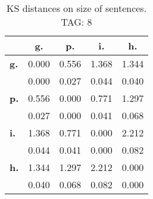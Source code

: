 \begin{table}[h!]
\begin{center}
\begin{tabular}{| l || c | c | c | c |}\hline
 & {\bf g.} & {\bf p.} & {\bf i.} & {\bf h.} \\\hline\hline
{\bf g.} & 0.000 & 0.556 & 1.368 & 1.344 \\
{\bf } & 0.000 & 0.027 & 0.044 & 0.040 \\\hline
{\bf p.} & 0.556 & 0.000 & 0.771 & 1.297 \\
{\bf } & 0.027 & 0.000 & 0.041 & 0.068 \\\hline
{\bf i.} & 1.368 & 0.771 & 0.000 & 2.212 \\
{\bf } & 0.044 & 0.041 & 0.000 & 0.082 \\\hline
{\bf h.} & 1.344 & 1.297 & 2.212 & 0.000 \\
{\bf } & 0.040 & 0.068 & 0.082 & 0.000 \\\hline
\end{tabular}
\caption{KS distances on size of sentences. TAG: 8}
\end{center}
\end{table}
